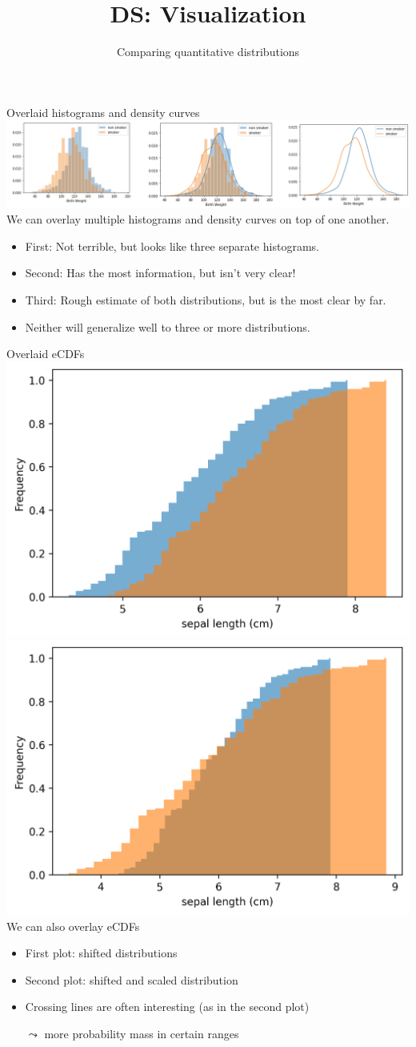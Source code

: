 \documentclass[aspectratio=169]{../latex_main/tntbeamer}  %
\title[Visualization]{DS: Visualization}
\subtitle{Comparing quantitative distributions}
\begin{document}
	
	\maketitle
	\begin{frame}{Overlaid histograms and density curves}
	    \includegraphics[scale=.35]{Bild42}\\
	    We can overlay multiple histograms and density curves on top of one another.
	    \begin{itemize}
	        \item First: Not terrible, but looks like three separate histograms.
	        \item Second: Has the most information, but isn’t very clear!
	        \item Third: Rough estimate of both distributions, but is the most clear by far.
	        \item Neither will generalize well to three or more distributions.
	    \end{itemize}
    \end{frame}
    
    \begin{frame}{Overlaid eCDFs}
        \includegraphics[width=.45\textwidth]{04_visualization/figure/cdf_iris_sepal_length_shifted.png}
	    \includegraphics[width=.45\textwidth]{04_visualization/figure/cdf_iris_sepal_length_shifted_scaled.png}\\
	    
	    We can also overlay eCDFs
	    \begin{itemize}
	        \item First plot: shifted distributions
	        \item Second plot: shifted and scaled distribution
	        \item Crossing lines are often interesting (as in the second plot)
	        \item[$\leadsto$] more probability mass in certain ranges
	    \end{itemize}
    \end{frame}
	
\end{document}
